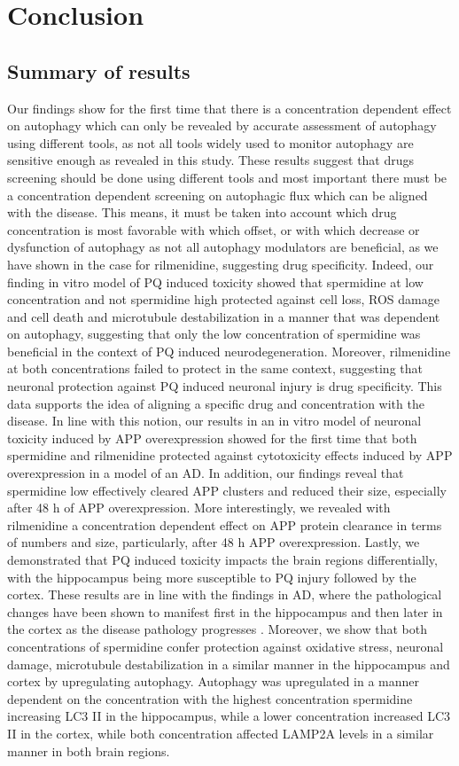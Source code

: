 \chapter{Conclusion}
\section{Summary of results}
Our findings show for the first time that there is a concentration dependent effect on autophagy which can only be revealed by accurate assessment of autophagy using different tools, as not all tools widely used to monitor autophagy are sensitive enough as revealed in this study. These results suggest that drugs screening should be done using different tools and most important there must be a concentration dependent screening on autophagic flux which can be aligned with the disease. This means, it must be taken into account which drug concentration is most favorable with which offset, or with which decrease or dysfunction of autophagy as not all autophagy modulators are beneficial, as we have shown in the case for rilmenidine, suggesting drug specificity. Indeed, our finding in vitro model of PQ induced toxicity showed that spermidine at low concentration and not spermidine high protected against cell loss, ROS damage and cell death and microtubule destabilization in a manner that was dependent on autophagy, suggesting that only the low concentration of spermidine was beneficial in the context of PQ induced neurodegeneration. Moreover, rilmenidine at both concentrations failed to protect in the same context, suggesting that neuronal protection against PQ induced neuronal injury is drug specificity. This data supports the idea of aligning a specific drug and concentration with the disease. In line with this notion, our results in an in vitro model of neuronal toxicity induced by APP overexpression showed for the first time that both spermidine and rilmenidine protected against cytotoxicity effects induced by APP overexpression in a model of an AD. In addition, our findings reveal that spermidine low effectively cleared APP clusters and reduced their size, especially after 48 h of APP overexpression. More interestingly, we revealed with rilmenidine a concentration dependent effect on APP protein clearance in terms of numbers and size, particularly, after 48 h APP overexpression. Lastly, we demonstrated that PQ induced toxicity impacts the brain regions differentially, with the hippocampus being more susceptible to PQ injury followed by the cortex. These results are in line with the findings in AD, where the pathological changes have been shown to manifest first in the hippocampus and then later in the cortex as the disease pathology progresses \citep{Braak2004,Braak1998,Braak1991,Braak2012}. Moreover, we show that both concentrations of spermidine confer protection against oxidative stress, neuronal damage, microtubule destabilization in a similar manner in the hippocampus and cortex by upregulating autophagy. Autophagy was upregulated in a manner dependent on the concentration with the highest concentration spermidine increasing LC3 II in the hippocampus, while a lower concentration increased LC3 II in the cortex, while both concentration affected LAMP2A levels in a similar manner in both brain regions. 

